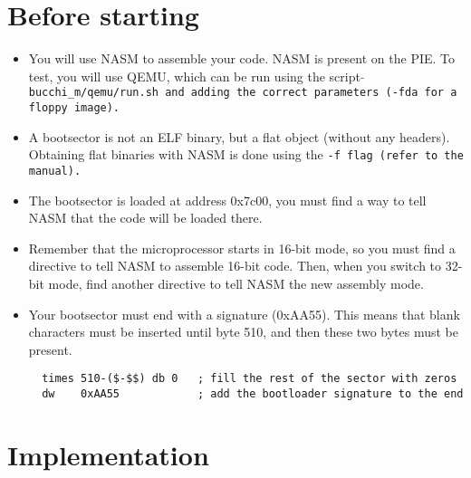 {\section*{Before starting}

\begin{itemize}
\item
  You will use NASM to assemble your code. NASM is present on the
  PIE. To test, you will use QEMU, which can be run using the script
  \tt $\tilde{}$bucchi\_m/qemu/run.sh \rm and adding the correct parameters
  (\tt -fda \rm for a floppy image).
\item
  A bootsector is not an ELF binary, but a flat object (without any
  headers). Obtaining flat binaries with NASM is done using the \tt -f \rm
  flag (refer to the manual).
\item
  The bootsector is loaded at address 0x7c00, you must find a way to
  tell NASM that the code will be loaded there.
\item
  Remember that the microprocessor starts in 16-bit mode, so you must
  find a directive to tell NASM to assemble 16-bit code. Then, when
  you switch to 32-bit mode, find another directive to tell NASM the
  new assembly mode.
\item
  Your bootsector must end with a signature (0xAA55). This means that
  blank characters must be inserted until byte 510, and then these two
  bytes must be present.
  \begin{verbatim}
  times 510-($-$$) db 0	  ; fill the rest of the sector with zeros
  dw    0xAA55            ; add the bootloader signature to the end
  \end{verbatim}
\end{itemize}

\newpage

\section*{Implementation}

}
